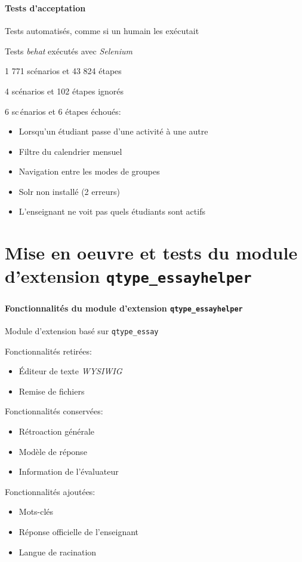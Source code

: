 \documentclass{beamer}
\begin{document}
  \begin{frame}
  \frametitle{\insertsection}
  \framesubtitle{Tests d'acceptation}
  Tests automatis\'es, comme si un humain les ex\'ecutait
  
  Tests \textit{behat} ex\'ecut\'es avec \textit{Selenium}
  
  \bigskip
  
  1 771 sc\'enarios et 43 824 \'etapes
  
  4 sc\'enarios et 102 \'etapes ignor\'es
  
  6 sc\,énarios et 6 \'etapes \'echou\'es:
  \begin{itemize}
    \item Lorsqu'un \'etudiant passe d'une activit\'e \`a une autre
    \item Filtre du calendrier mensuel
    \item Navigation entre les modes de groupes
    \item Solr non install\'e (2 erreurs)
    \item L'enseignant ne voit pas quels \'etudiants sont actifs
  \end{itemize}
  \end{frame}
  
  \section[Mise en oeuvre]{Mise en oeuvre et tests du module d'extension \texttt{qtype\_essayhelper}}
  \begin{frame}
  \frametitle{\insertsection}
  \framesubtitle{Fonctionnalit\'es du module d'extension \texttt{qtype\_essayhelper}}
  Module d'extension bas\'e sur \texttt{qtype\_essay}
  
  Fonctionnalit\'es retir\'ees:
  \begin{itemize}
    \item \'Editeur de texte \textit{WYSIWIG}
    \item Remise de fichiers
  \end{itemize}
  
  Fonctionnalit\'es conserv\'ees:
  \begin{itemize}
    \item R\'etroaction g\'en\'erale
    \item Mod\`ele de r\'eponse
    \item Information de l'\'evaluateur
  \end{itemize}
  
  Fonctionnalit\'es ajout\'ees:
  \begin{itemize}
    \item Mots-cl\'es
    \item R\'eponse officielle de l'enseignant
    \item Langue de racination
  \end{itemize}
  \end{frame}
  
\end{document}
